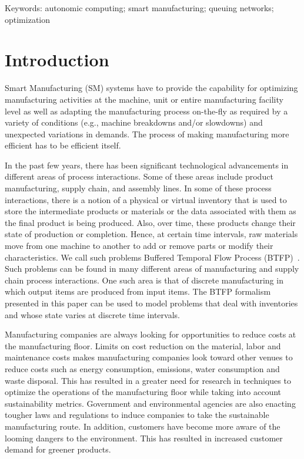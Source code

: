 \documentclass[a4paper, 12pt]{article} %
\begin{document}
{\small Keywords: autonomic computing; smart manufacturing; queuing networks; optimization} %

\vspace{5pt} %

\section{Introduction}
Smart Manufacturing (SM) systems have to provide the capability for optimizing  manufacturing activities at the machine, unit or entire manufacturing facility level as well as adapting the manufacturing process on-the-fly as required by a variety of conditions (e.g., machine breakdowns and/or slowdowns) and unexpected variations in demands.  The process of making manufacturing more efficient has to be efficient itself.

In the past few years, there has been significant technological advancements in different areas of process interactions. Some of these areas include product manufacturing, supply chain, and assembly lines. In some of these process interactions, there is a notion of a physical or virtual inventory that is used to store the intermediate products or materials or the data associated with them as the final product is being produced. Also, over time, these products change their state of production or completion. Hence, at certain time intervals, raw materials move from one machine to another to add or remove parts or modify their characteristics. We call such problems Buffered Temporal Flow Process (BTFP)~\cite{IJOC}. Such problems can be found in many different areas of manufacturing and supply chain process interactions. One such area is that of discrete manufacturing in which output items are produced from input items. The BTFP formalism presented in this paper can be used to model problems that deal with inventories and whose state varies at discrete time intervals.

Manufacturing companies are always looking for opportunities to reduce costs at the manufacturing floor. Limits on cost reduction on the material, labor and maintenance costs makes manufacturing companies look toward other venues to reduce costs such as energy consumption, emissions, water consumption and waste disposal. This has resulted in a greater need for research in techniques to optimize the operations of the manufacturing floor while taking into account sustainability metrics. Government and environmental agencies are also enacting tougher laws and regulations to induce companies to take the sustainable manufacturing route. In addition, customers have become more aware of the looming dangers to the environment. This has resulted in increased customer demand for greener products.
\end{document}
